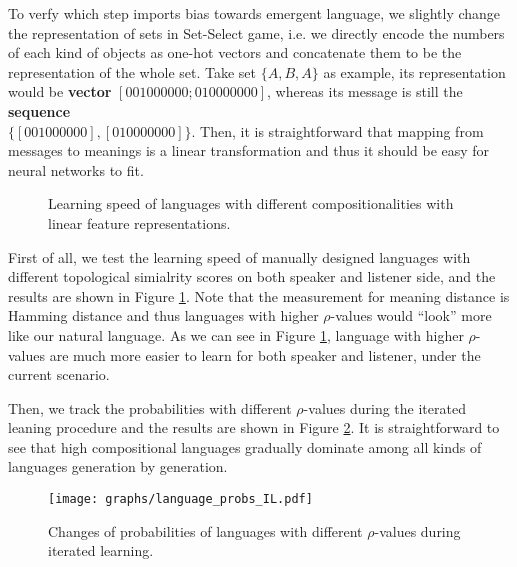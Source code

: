 To verfy which step imports bias towards emergent language, we slightly change the representation of sets in Set-Select game, i.e. we directly encode the numbers of each kind of objects as one-hot vectors and concatenate them to be the representation of the whole set. Take set $\{A, B, A\}$ as example, its representation would be \textbf{vector} $[0 0 1 0 0 0 0 0 0; 0 1 0 0 0 0 0 0 0]$, whereas its message is still the \textbf{sequence} \\ $\{[0 0 1 0 0 0 0 0 0], [0 1 0 0 0 0 0 0 0]\}$. Then, it is straightforward that mapping from messages to meanings is a linear transformation and thus it should be easy for neural networks to fit.

\begin{figure}[!h]
    \centering
    \caption{Learning speed of languages with different compositionalities with linear feature representations.}
    \label{fig4.5:learning_speed_joshua}
\end{figure}

First of all, we test the learning speed of manually designed languages with different topological simialrity scores on both speaker and listener side, and the results are shown in Figure \ref{fig4.5:learning_speed_joshua}. Note that the measurement for meaning distance is Hamming distance and thus languages with higher $\rho$-values would ``look'' more like our natural language. As we can see in Figure \ref{fig4.5:learning_speed_joshua}, language with higher $\rho$-values are much more easier to learn for both speaker and listener, under the current scenario.

Then, we track the probabilities with different $\rho$-values during the iterated leaning procedure and the results are shown in Figure \ref{fig4.6:lan_prob_IL}. It is straightforward to see that high compositional languages gradually dominate among all kinds of languages generation by generation. 

\begin{figure}[!h]
    \centering
    \texttt{[image: graphs/language\_probs\_IL.pdf]}
    \caption{Changes of probabilities of languages with different $\rho$-values during iterated learning.}
    \label{fig4.6:lan_prob_IL}
\end{figure}

